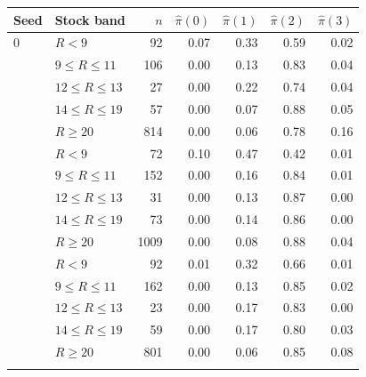 \begin{tabular}{llrrrrr}
\toprule
Seed & Stock band & $n$ & $\hat\pi(0)$ & $\hat\pi(1)$ & $\hat\pi(2)$ & $\hat\pi(3)$ \\
\midrule
0 & $R<9$ & 92 & 0.07 & 0.33 & 0.59 & 0.02 \\
 & $9\le R\le 11$ & 106 & 0.00 & 0.13 & 0.83 & 0.04 \\
 & $12\le R\le 13$ & 27 & 0.00 & 0.22 & 0.74 & 0.04 \\
 & $14\le R\le 19$ & 57 & 0.00 & 0.07 & 0.88 & 0.05 \\
 & $R\ge 20$ & 814 & 0.00 & 0.06 & 0.78 & 0.16 \\
\addlinespace
1 & $R<9$ & 72 & 0.10 & 0.47 & 0.42 & 0.01 \\
 & $9\le R\le 11$ & 152 & 0.00 & 0.16 & 0.84 & 0.01 \\
 & $12\le R\le 13$ & 31 & 0.00 & 0.13 & 0.87 & 0.00 \\
 & $14\le R\le 19$ & 73 & 0.00 & 0.14 & 0.86 & 0.00 \\
 & $R\ge 20$ & 1009 & 0.00 & 0.08 & 0.88 & 0.04 \\
\addlinespace
2 & $R<9$ & 92 & 0.01 & 0.32 & 0.66 & 0.01 \\
 & $9\le R\le 11$ & 162 & 0.00 & 0.13 & 0.85 & 0.02 \\
 & $12\le R\le 13$ & 23 & 0.00 & 0.17 & 0.83 & 0.00 \\
 & $14\le R\le 19$ & 59 & 0.00 & 0.17 & 0.80 & 0.03 \\
 & $R\ge 20$ & 801 & 0.00 & 0.06 & 0.85 & 0.08 \\
\addlinespace
\bottomrule
\end{tabular}
